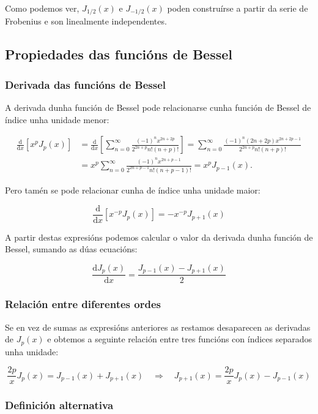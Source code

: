 \documentclass[a4paper,12pt,titlepage]{article}
\begin{document}
Como podemos ver, $J_{1 / 2}(x)$ e $J_{-1 / 2}(x)$ poden construírse a partir da serie de Frobenius e son linealmente independentes.

\subsection{Propiedades das funcións de Bessel}

\subsubsection{Derivada das funcións de Bessel}

A derivada dunha función de Bessel pode relacionarse cunha función de Bessel de índice unha unidade menor:

$$
\begin{aligned}
\frac{\mathrm{d}}{\mathrm{d} x}\left[x^{p} J_{p}(x)\right] & =\frac{\mathrm{d}}{\mathrm{d} x}\left[\sum_{n=0}^{\infty} \frac{(-1)^{n} x^{2 n+2 p}}{2^{2 n+p} n !(n+p) !}\right]=\sum_{n=0}^{\infty} \frac{(-1)^{n}(2 n+2 p) x^{2 n+2 p-1}}{2^{2 n+p} n !(n+p) !} \\
& =x^{p} \sum_{n=0}^{\infty} \frac{(-1)^{n} x^{2 n+p-1}}{2^{2 n+p-1} n !(n+p-1) !}=x^{p} J_{p-1}(x) .
\end{aligned}
$$

Pero tamén se pode relacionar cunha de índice unha unidade maior:

$$
\frac{\mathrm{d}}{\mathrm{d} x}\left[x^{-p} J_{p}(x)\right]=-x^{-p} J_{p+1}(x)
$$

A partir destas expresións podemos calcular o valor da derivada dunha función de Bessel, sumando as dúas ecuacións:

$$
\frac{\mathrm{d} J_{p}(x)}{\mathrm{d} x}=\frac{J_{p-1}(x)-J_{p+1}(x)}{2}
$$

\subsubsection{Relación entre diferentes ordes}

Se en vez de sumas as expresións anteriores as restamos desaparecen as derivadas de $J_p(x)$ e obtemos a seguinte relación entre tres funcións con índices separados unha unidade:

$$
\frac{2 p}{x} J_{p}(x)=J_{p-1}(x)+J_{p+1}(x) \quad \Rightarrow \quad J_{p+1}(x)=\frac{2 p}{x} J_{p}(x)-J_{p-1}(x) 
$$

\subsubsection{Definición alternativa}
\end{document}

